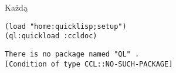 \documentclass[a4paper,11pt]{article}  %
\begin{document}
Każdą
\begin{lstlisting}
(load "home:quicklisp;setup")
(ql:quickload :ccldoc)
\end{lstlisting}

\begin{lstlisting}
There is no package named "QL" .
[Condition of type CCL::NO-SUCH-PACKAGE]
\end{lstlisting}









\end{document}

